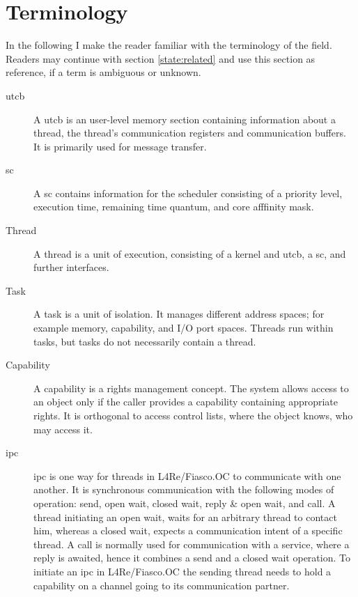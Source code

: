 \section{Terminology}
\label{state:term}

In the following I make the reader familiar with the terminology of the field.
Readers may continue with section \ref{state:related} and use this section
as reference, if a term is ambiguous or unknown.


\begin{description}
  \item[\Gls{utcb}] A \gls{utcb} is an user-level memory section containing
    information about a thread, the thread's communication registers and
    communication buffers. It is primarily used for message transfer.

  \item[\Gls{sc}] A \gls{sc} contains information for the scheduler consisting
    of a priority level, execution time, remaining time quantum, and core
    afffinity mask.

  \item[Thread] A thread is a unit of execution, consisting of a kernel and
    \gls{utcb}, a \gls{sc}, and further interfaces.

  \item[Task] A task is a unit of isolation. It manages different address
    spaces; for example memory, capability, and I/O port spaces.
    Threads run within tasks, but tasks do not necessarily contain a thread.

  \item[Capability] A capability is a rights management concept.
    The system allows access to an object only if the caller provides a
    capability containing appropriate rights.
    It is orthogonal to access control lists, where the object knows, who may
    access it.

  \item[\Gls{ipc}] \Gls{ipc} is one way for threads in L4Re/Fiasco.OC
    to communicate with one another.
    It is synchronous communication with the following modes of operation:
    send, open wait, closed wait, reply \& open wait, and call.
    A thread initiating an open wait, waits for an arbitrary thread to contact
    him, whereas a closed wait, expects a communication intent of a specific
    thread.
    A call is normally used for communication with a service, where a reply is
    awaited, hence it combines a send and a closed wait operation.
    To initiate an \gls{ipc} in L4Re/Fiasco.OC the sending thread needs to hold
    a capability on a channel going to its communication partner.


\end{description}
